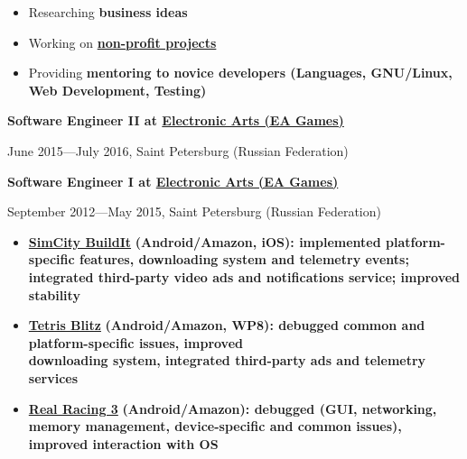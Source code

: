 \begin{itemize}[rightmargin=\dimexpr\linewidth-18cm-\leftmargin\relax]
    \item Researching \bfseries business \mdseries ideas
    \item Working on \bfseries \href{https://alopatindev.github.io/projects/}{non-profit projects}\mdseries
    \item Providing \bfseries mentoring \mdseries to novice developers (Languages, GNU/Linux, Web Development, Testing)
\end{itemize}

\vspace{0.5cm}

{
\fontsize{12pt}{12pt}\selectfont
\bfseries Software Engineer II at
\href{http://www.ea.com}{Electronic Arts (EA Games)}
\mdseries
}

{
\fontsize{9pt}{8pt}\selectfont
June 2015---July 2016, Saint Petersburg (Russian Federation)
}


\vspace{0.2cm}

{
\fontsize{12pt}{12pt}\selectfont
\bfseries Software Engineer I at
\href{http://www.ea.com}{Electronic Arts (EA Games)}
\mdseries
}

{
\fontsize{9pt}{8pt}\selectfont
September 2012---May 2015, Saint Petersburg (Russian Federation)
}

\vspace{0.2cm}

\begin{itemize}[rightmargin=\dimexpr\linewidth-18cm-\leftmargin\relax]
\item
    \href{http://www.ea.com/simcity-buildit}
        {\bfseries SimCity BuildIt\mdseries}
        \bfseries (Android/Amazon, iOS)\mdseries:
        implemented platform-specific features,
        downloading system
        and telemetry events;
        integrated third-party video ads and notifications service;
        improved stability
\item
    \href{http://www.tetrisblitz.com}
        {\bfseries Tetris Blitz\mdseries}
        \bfseries(Android/Amazon, WP8)\mdseries:
        debugged common and platform-specific issues,
        improved \\ downloading system,
        integrated third-party ads and telemetry services
\item
    \href{http://www.ea.com/real-racing-3}
        {\bfseries Real Racing 3\mdseries}
        \bfseries (Android/Amazon)\mdseries:
        debugged (GUI, networking, memory management, device-specific and common issues),
        improved interaction with OS
\end{itemize}

